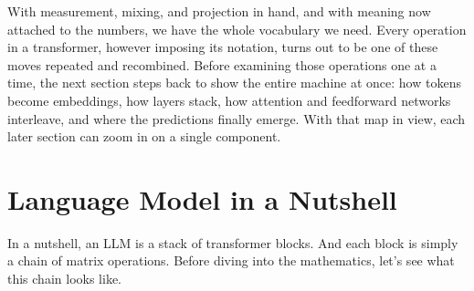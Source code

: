 \documentclass[11pt]{article}
\begin{document}
\bigskip

With measurement, mixing, and projection in hand, and with meaning now attached to the numbers, we have the whole vocabulary we need. Every operation in a transformer, however imposing its notation, turns out to be one of these moves repeated and recombined. Before examining those operations one at a time, the next section steps back to show the entire machine at once: how tokens become embeddings, how layers stack, how attention and feedforward networks interleave, and where the predictions finally emerge. With that map in view, each later section can zoom in on a single component.

\newpage
\section{Language Model in a Nutshell}

In a nutshell, an LLM is a stack of transformer blocks. And each block is simply a chain of matrix operations. Before diving into the mathematics, let's see what this chain looks like.
\end{document}
